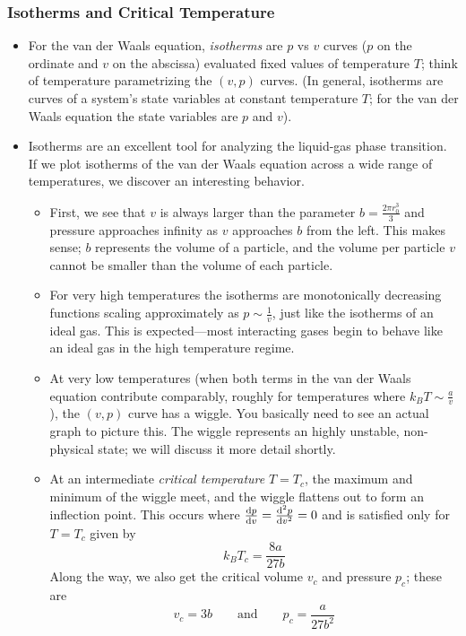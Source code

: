 \documentclass[11pt, a4paper]{article}
\begin{document}
\subsubsection{Isotherms and Critical Temperature}
\begin{itemize}
	\item For the van der Waals equation, \textit{isotherms} are $ p $ vs $ v $ curves ($ p $ on the ordinate and $ v $ on the abscissa) evaluated fixed values of temperature $ T $; think of temperature parametrizing the $ (v, p) $ curves. (In general, isotherms are curves of a system's state variables at constant temperature $ T $; for the van der Waals equation the state variables are $ p $ and $ v $).
	
	\item Isotherms are an excellent tool for analyzing the liquid-gas phase transition. If we plot isotherms of the van der Waals equation across a wide range of temperatures, we discover an interesting behavior. 
	\begin{itemize}
		\item First, we see that $ v $ is always larger than the parameter $ b = \frac{2\pi r_{0}^{3}}{3} $ and pressure approaches infinity as $ v $ approaches $ b $ from the left. This makes sense; $ b $ represents the volume of a particle, and the volume per particle $ v $ cannot be smaller than the volume of each particle.
		
		\item For very high temperatures the isotherms are monotonically decreasing functions scaling approximately as $ p \sim \frac{1}{v} $, just like the isotherms of an ideal gas. This is expected---most interacting gases begin to behave like an ideal gas in the high temperature regime.
		
		\item At very low temperatures (when both terms in the van der Waals equation contribute comparably, roughly for temperatures where $ k_{B}T \sim \frac{a}{v} $), the $ (v, p) $ curve has a wiggle. You basically need to see an actual graph to picture this. The wiggle represents an highly unstable, non-physical state; we will discuss it more detail shortly.
		
		\item At an intermediate \textit{critical temperature}  $ T = T_{c} $, the maximum and minimum of the wiggle meet, and the wiggle flattens out to form an inflection point. This occurs where $ \dv{p}{v} = \dv[2]{p}{v} = 0 $ and is satisfied only for $ T = T_{c} $ given by
		\begin{equation*}
			k_{B}T_{c} = \frac{8a}{27b}
		\end{equation*}
		Along the way, we also get the critical volume $ v_{c} $ and pressure $ p_{c} $; these are
		\begin{equation*}
			v_{c} = 3b \qquad \text{and} \qquad p_{c} = \frac{a}{27b^{2}}
		\end{equation*}
		

\end{itemize}
\end{itemize}
\end{document}
